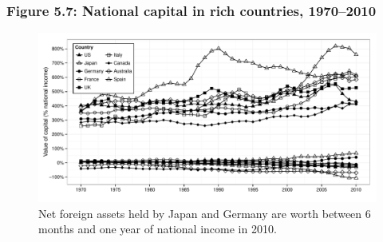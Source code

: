 \documentclass[t]{beamer}\usepackage[]{graphicx}\usepackage[]{color}
\newenvironment{knitrout}{}{} %
\begin{document}
\begin{frame}[label=Figure_5_7]
\frametitle{Figure 5.7: National capital in rich countries, 1970--2010}
\begin{figure}[t]
\begin{minipage}[b]{\textwidth}
\centering
\begin{knitrout}\footnotesize
{}\color{fgcolor}

{\centering \includegraphics[width=1\linewidth,height=0.75\textheight]{figures/bw/Figure_5_7} 

}



\end{knitrout}
\caption{Net foreign assets held by Japan and Germany are worth between 6 months and one year of national income in 2010.}
\end{minipage}
\end{figure}
\end{frame}
\end{document}
